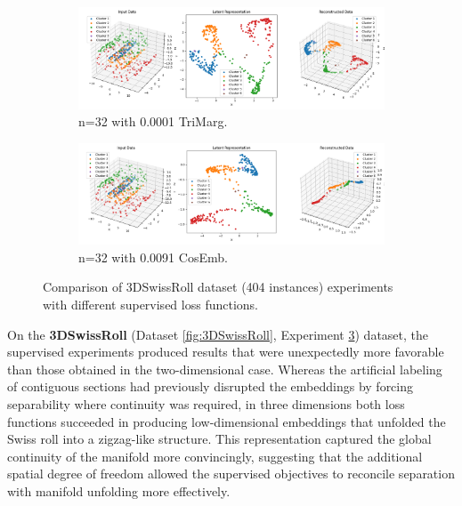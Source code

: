 \begin{figure}[htbp]
  \centering
  \begin{subfigure}[b]{1.0\textwidth}
    \centering
    \includegraphics[width=\linewidth]{images/RQ3/tri/3DSwissRoll_32_0.0001.png}
    \caption{n=32 with 0.0001 TriMarg.}
    \label{fig:RQ3/tri/3DSwissRoll}
  \end{subfigure}
  \hfill
  \begin{subfigure}[b]{1.0\textwidth}
    \centering
    \includegraphics[width=\linewidth]{images/RQ3/cos/3DSwissRoll_32_0.0091.png}
    \caption{n=32 with 0.0091 CosEmb.}
    \label{fig:RQ3/cos/3DSwissRoll}
  \end{subfigure} 

  \caption{Comparison of 3DSwissRoll dataset (404 instances) experiments with different
supervised loss functions.}
  \label{fig:RQ3/3DSwissRoll}
\end{figure}

On the \textbf{3DSwissRoll} (Dataset \ref{fig:3DSwissRoll}, Experiment \ref{fig:RQ3/3DSwissRoll}) dataset, the supervised experiments produced results that were unexpectedly more favorable than those obtained in the two-dimensional case. Whereas the artificial labeling of contiguous sections had previously disrupted the embeddings by forcing separability where continuity was required, in three dimensions both loss functions succeeded in producing low-dimensional embeddings that unfolded the Swiss roll into a zigzag-like structure. This representation captured the global continuity of the manifold more convincingly, suggesting that the additional spatial degree of freedom allowed the supervised objectives to reconcile separation with manifold unfolding more effectively.

